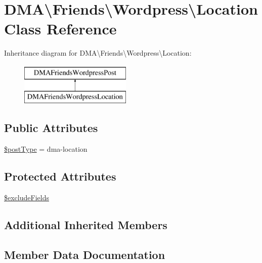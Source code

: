 \hypertarget{classDMA_1_1Friends_1_1Wordpress_1_1Location}{}\section{D\+M\+A\textbackslash{}Friends\textbackslash{}Wordpress\textbackslash{}Location Class Reference}
\label{classDMA_1_1Friends_1_1Wordpress_1_1Location}
Inheritance diagram for D\+M\+A\textbackslash{}Friends\textbackslash{}Wordpress\textbackslash{}Location\+:\begin{figure}[H]
\begin{center}
\leavevmode
\includegraphics[height=2.000000cm]{d3/d8d/classDMA_1_1Friends_1_1Wordpress_1_1Location}
\end{center}
\end{figure}
\subsection*{Public Attributes}
\begin{DoxyCompactItemize}
\item 
\hyperlink{classDMA_1_1Friends_1_1Wordpress_1_1Location_a40f4ecf15a53d860bfbba3484f2999bf}{\$post\+Type} = \textquotesingle{}dma-\/location\textquotesingle{}
\end{DoxyCompactItemize}
\subsection*{Protected Attributes}
\begin{DoxyCompactItemize}
\item 
\hyperlink{classDMA_1_1Friends_1_1Wordpress_1_1Location_ae18a475210d12a42d335d6ca6fb47811}{\$exclude\+Fields}
\end{DoxyCompactItemize}
\subsection*{Additional Inherited Members}


\subsection{Member Data Documentation}
\hypertarget{classDMA_1_1Friends_1_1Wordpress_1_1Location_ae18a475210d12a42d335d6ca6fb47811}{}
